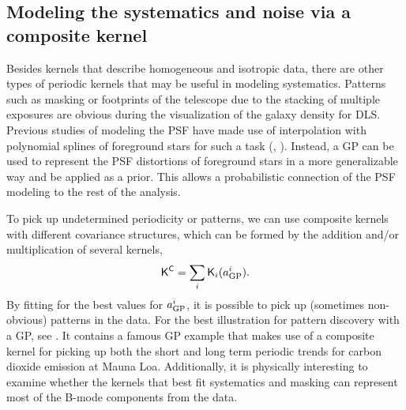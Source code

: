  

\subsection{Modeling the systematics and noise via a composite kernel}
Besides kernels that describe homogeneous and isotropic data,
there are other types of periodic kernels that may be useful
in modeling systematics. 
Patterns such as masking or footprints of the telescope due to the
stacking of multiple exposures are obvious during the visualization of the
galaxy density for DLS. 
Previous studies of modeling the PSF
have made use of interpolation with polynomial splines of foreground stars 
for such a task (\citealt{Rowe2010},
\citealt{Jee2013a}).  Instead, a GP can be used to represent the PSF distortions
of foreground stars in a more generalizable way \citep{Berge2012} and be
applied as a prior. This allows a probabilistic connection of the 
PSF modeling to the rest of the
analysis. 

To pick up undetermined periodicity or patterns, 
we can use composite kernels with different covariance structures, 
which can be formed by the addition and/or multiplication of several kernels,
\begin{equation}
	\mathsf{K}^{\mathsf{C}} = \sum_i \mathsf{K}_i(a_{\rm GP}^i).
\end{equation}
By fitting for the best values for $a_{\rm GP}^i$, it is possible  
to pick up (sometimes non-obvious) patterns in the data. 
For the best illustration for pattern discovery with a GP, see
\cite{Duvenaud2013}.
It contains a famous GP example that makes use of a composite kernel for picking up both the 
short and long term periodic trends for carbon dioxide emission at Mauna Loa.
Additionally, it is physically interesting to examine whether the kernels that best 
fit systematics and masking can represent most of the B-mode components
from the data. 

